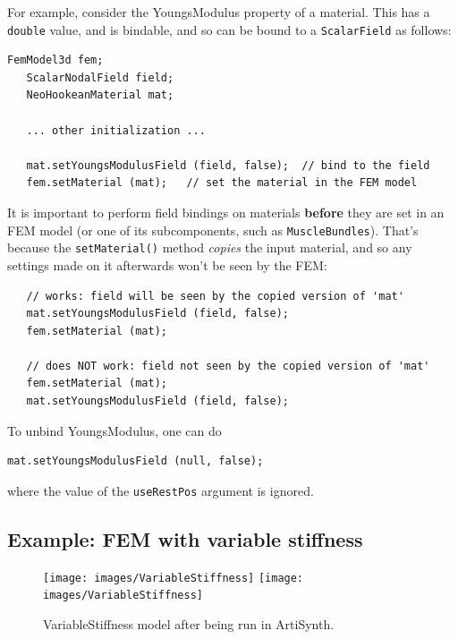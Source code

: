 For example, consider the {\sf YoungsModulus} property of a
 material. This
has a {\tt double} value, and is bindable, and so can be
bound to a {\tt ScalarField} as follows:
%
\begin{lstlisting}[]
   FemModel3d fem;
   ScalarNodalField field;
   NeoHookeanMaterial mat;
  
   ... other initialization ...

   mat.setYoungsModulusField (field, false);  // bind to the field
   fem.setMaterial (mat);   // set the material in the FEM model
\end{lstlisting}
%
\begin{sideblock}
It is important to perform field bindings on materials {\bf before} 
they are set in an FEM model (or one of its subcomponents, such
as {\tt MuscleBundles}). That's because the {\tt setMaterial()} method
{\it copies} the input material, and so any settings made on it
afterwards won't be seen by the FEM:
\begin{verbatim}
   // works: field will be seen by the copied version of 'mat'
   mat.setYoungsModulusField (field, false); 
   fem.setMaterial (mat);

   // does NOT work: field not seen by the copied version of 'mat'
   fem.setMaterial (mat);
   mat.setYoungsModulusField (field, false); 
\end{verbatim}
\end{sideblock}

To unbind {\sf YoungsModulus}, one can do
%
\begin{lstlisting}[]
   mat.setYoungsModulusField (null, false);
\end{lstlisting}
%
where the value of the {\tt useRestPos} argument is ignored.

\subsection{Example: FEM with variable stiffness}
\label{VariableStiffness:sec}

\begin{figure}[ht]
\begin{center}
\iflatexml
 \texttt{[image: images/VariableStiffness]}
\else
 \texttt{[image: images/VariableStiffness]}
\fi
\end{center}
\caption{VariableStiffness model after being run in ArtiSynth.}
\label{VariableStiffness:fig}
\end{figure}

